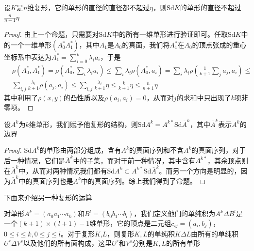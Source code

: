 \begin{proposition}\label{pro_1_1282}
设$K$是$n$维复形，它的单形的直径的直径都不超过$\eta$，则$\text{Sd}K$的单形的直径不超过$\frac{n}{n+1}\eta$
\end{proposition}
\begin{proof}
由上一个命题，只需要对$\text{Sd}K$中的所有一维单形进行验证即可。任取$\text{Sd}K$中的一个一维单形$(A^{*}_{0}A^{*}_{1})$，其中$A_{1}$是$A_{0}$的真面，我们将$A^{*}_{1}$在$A_{0}$的顶点张成的重心坐标系中表达为$A_{1}^{*}=\sum\limits_{i=0}^{k}\lambda_{i}a_{i}$，于是
\begin{equation*}
    \begin{aligned}
    &\rho(A^{*}_{0},A^{*}_{1})=\rho(A^{*}_{0},\sum\limits_{i}\lambda_{i}a_{i})\leq \sum\limits_{i} \lambda_{i}\rho(A^{*}_{0},a_{i})=\sum\limits_{i}\lambda_{i}\rho(\frac{1}{k+1}\sum\limits_{j} a_{j},a_{i})\leq\\& \sum\limits_{i,j}\frac{\lambda_{i}}{k+1}\rho(a_{j},a_{i})\leq \sum\limits_{i,j}\frac{\lambda_{i}}{k+1}\eta\leq\frac{k}{k+1}\eta\leq\frac{n}{n+1}\eta
    \end{aligned}
\end{equation*}
其中利用了$\rho(x,y)$的凸性质以及$\rho(a_{i},a_{i})=0$，从而对$j$的求和中只出现了$k$项非零项。
\end{proof}
\begin{proposition}\label{pro1288}
设$A^{k}$为$k$维单形，我们赋予他复形的结构，则$\text{Sd}A^{k}=A^{k*}\text{Sd}\overline{A}^{k}$，其中$\overline{A}^{k}$表示$A^{k}$的边界
\end{proposition}
\begin{proof}
$\text{Sd}A^{k}$的单形由两部分组成，含有$A^{k}$的真面序列和不含$A^{k}$的真面序列，对于后一种情况，它们是$\overline{A}^{k}$中的子集，而对于前一种情况，其中含有$A^{k*}$，其余顶点则在$\overline{A}^{k}$中，从而对两种情况我们都有$\text{Sd}A^{k}\subset A^{k*}\text{Sd}\overline{A}^{k}$。而另一个方向是明显的，因为$\overline{A}^{k}$中的真面序列也是$A^{k}$中的真面序列。综上我们得到了命题。
\end{proof}
下面来介绍另一种复形的运算
\begin{definition}
对单形$A^{k}=(a_{0}a_{1}\cdots a_{k})$和$B^{l}=(b_{0}b_{1}\cdots b_{l})$，我们定义他们的单纯积为$A^{k}\Delta B^{l}$是一个$(k+1)\times (l+1)-1$维单形，它的顶点是二元组$c_{ij}=(a_{i},b_{j})$，$0\leq i\leq k,0\leq j\leq l$。对于复形$K$,$L$，则复形$K,L$的单纯积$K\Delta L$由所有的单纯积$U^{r}\Delta V^{s}$以及他们的所有面构成，这里$U^{r}$和$V^{s}$分别是$K,L$的所有单形
\end{definition}
